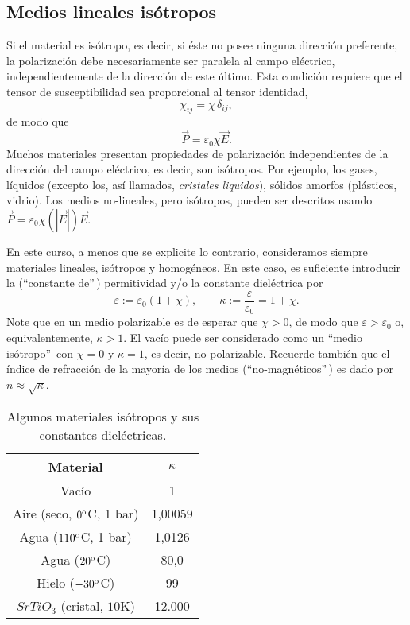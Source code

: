 \subsection{Medios lineales isótropos}\label{sec:iso}
Si el material es isótropo, es decir, si éste no posee ninguna dirección
preferente, la polarización debe necesariamente ser paralela al campo
eléctrico, independientemente de la dirección de este último. Esta condición requiere que el tensor de susceptibilidad sea proporcional al tensor identidad,
\begin{equation}
\chi_{ij}=\chi\,\delta_{ij},
\end{equation}
de modo que
\begin{equation}
\vec{P}=\varepsilon_0\chi\vec{E}.
\end{equation}
Muchos materiales presentan propiedades de polarización independientes de
la dirección del campo eléctrico, es decir, son isótropos. Por ejemplo, los
gases, líquidos (excepto los, así llamados, \textit{cristales liquidos}), sólidos amorfos (plásticos, vidrio).
Los medios no-lineales, pero isótropos, pueden ser descritos usando
$\vec{P}=\varepsilon_0\chi(|\vec{E}|)\vec{E}$.

En este curso, a menos que se explicite lo contrario, consideramos siempre
materiales lineales, isótropos y homogéneos. En este caso, es suficiente
introducir la (``constante de''\,) permitividad y/o la constante dieléctrica
por
\begin{equation}
\varepsilon:=\varepsilon_0(1+\chi), \qquad
\kappa:=\frac{\varepsilon}{\varepsilon_0}=1+\chi.
\end{equation}
Note que en un medio polarizable es de esperar que $\chi>0$, de modo que
$\varepsilon>\varepsilon_0$ o, equivalentemente, $\kappa>1$. El vacío puede ser
considerado como un ``medio isótropo''\, con $\chi=0$ y $\kappa=1$, es decir, no polarizable.
Recuerde también que el índice de refracción de la mayoría de los medios
(``no-magnéticos''\,) es dado por $n\approx\sqrt{\kappa}$.
\begin{table}[!h]
\begin{center}
\begin{tabular}{c|c}
Material &   $\kappa$ \\ \hline\hline
Vacío & 1 \\
Aire (seco, $0^{\rm o}$C, 1 bar)  & 1,00059 \\
Agua ($110^{\rm o}$C, 1 bar)  & 1,0126 \\
Agua ($20^{\rm o}$C) &  80,0 \\
Hielo ($-30^{\rm o}$C) &  99 \\
$SrTiO_3$ (cristal, $10$K)  & 12.000 \\
\end{tabular}
\caption{Algunos materiales isótropos y sus constantes dieléctricas.}
\end{center}
\end{table}

